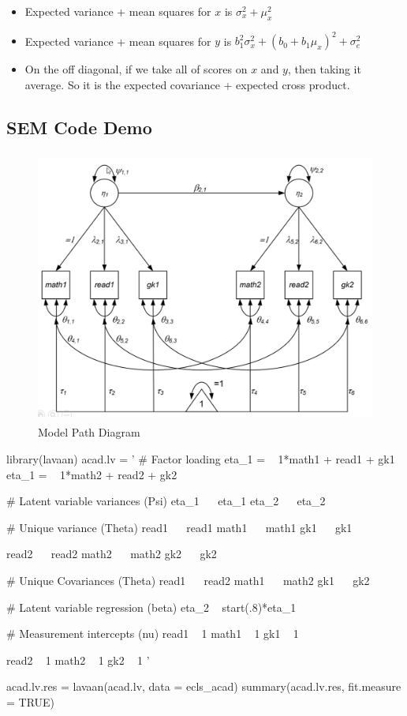     \begin{itemize}
        \item Expected variance + mean squares for $x$ is $\sigma_x^2 + \mu_x^2$
        \item Expected variance + mean squares for $y$ is $b_1^2\sigma_x^2 + (b_0 + b_1\mu_x)^2 + \sigma_e^2$
        \item On the off diagonal, if we take all of scores on $x$ and $y$, then taking it average. So it is the expected covariance + expected cross product. 
    \end{itemize}

\subsection{SEM Code Demo} 
    \begin{figure}[ht]
        \centering
        \includegraphics[width = 12cm, height = 9cm]{images/003_sem_program_mod_sample.png}
        \caption{Model Path Diagram}
        \label{fig:sem_program_mod}
    \end{figure}
    
\begin{R}
library(lavaan)
acad.lv = '
    # Factor loading 
    eta_1 = ~ 1*math1 + read1 + gk1
    eta_1 = ~ 1*math2 + read2 + gk2
    
    # Latent variable variances (Psi) 
    eta_1 ~~ eta_1
    eta_2 ~~ eta_2 
    
    # Unique variance (Theta)
    read1 ~~ read1
    math1 ~~ math1
    gk1 ~~ gk1
    
    read2 ~~ read2
    math2 ~~ math2
    gk2 ~~ gk2 
    
    # Unique Covariances (Theta) 
    read1 ~~ read2 
    math1 ~~ math2
    gk1 ~~ gk2
    
    # Latent variable regression (beta) 
    eta_2 ~ start(.8)*eta_1
    
    # Measurement intercepts (nu)
    read1 ~ 1
    math1 ~ 1
    gk1 ~ 1
    
    read2 ~ 1
    math2 ~ 1
    gk2 ~ 1
'

acad.lv.res = lavaan(acad.lv, data = ecls_acad)
summary(acad.lv.res, fit.measure = TRUE)
\end{R}




